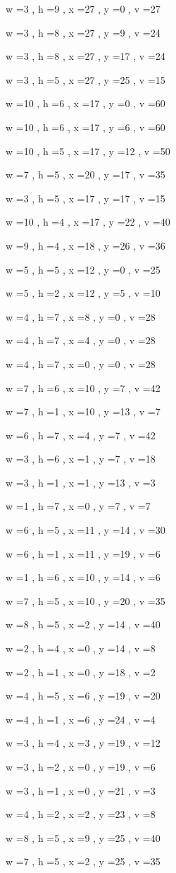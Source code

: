 \documentclass[11pt]{article}
\begin{document}
w =3 , h =9 , x =27 , y =0 , v =27
\par
w =3 , h =8 , x =27 , y =9 , v =24
\par
w =3 , h =8 , x =27 , y =17 , v =24
\par
w =3 , h =5 , x =27 , y =25 , v =15
\par
w =10 , h =6 , x =17 , y =0 , v =60
\par
w =10 , h =6 , x =17 , y =6 , v =60
\par
w =10 , h =5 , x =17 , y =12 , v =50
\par
w =7 , h =5 , x =20 , y =17 , v =35
\par
w =3 , h =5 , x =17 , y =17 , v =15
\par
w =10 , h =4 , x =17 , y =22 , v =40
\par
w =9 , h =4 , x =18 , y =26 , v =36
\par
w =5 , h =5 , x =12 , y =0 , v =25
\par
w =5 , h =2 , x =12 , y =5 , v =10
\par
w =4 , h =7 , x =8 , y =0 , v =28
\par
w =4 , h =7 , x =4 , y =0 , v =28
\par
w =4 , h =7 , x =0 , y =0 , v =28
\par
w =7 , h =6 , x =10 , y =7 , v =42
\par
w =7 , h =1 , x =10 , y =13 , v =7
\par
w =6 , h =7 , x =4 , y =7 , v =42
\par
w =3 , h =6 , x =1 , y =7 , v =18
\par
w =3 , h =1 , x =1 , y =13 , v =3
\par
w =1 , h =7 , x =0 , y =7 , v =7
\par
w =6 , h =5 , x =11 , y =14 , v =30
\par
w =6 , h =1 , x =11 , y =19 , v =6
\par
w =1 , h =6 , x =10 , y =14 , v =6
\par
w =7 , h =5 , x =10 , y =20 , v =35
\par
w =8 , h =5 , x =2 , y =14 , v =40
\par
w =2 , h =4 , x =0 , y =14 , v =8
\par
w =2 , h =1 , x =0 , y =18 , v =2
\par
w =4 , h =5 , x =6 , y =19 , v =20
\par
w =4 , h =1 , x =6 , y =24 , v =4
\par
w =3 , h =4 , x =3 , y =19 , v =12
\par
w =3 , h =2 , x =0 , y =19 , v =6
\par
w =3 , h =1 , x =0 , y =21 , v =3
\par
w =4 , h =2 , x =2 , y =23 , v =8
\par
w =8 , h =5 , x =9 , y =25 , v =40
\par
w =7 , h =5 , x =2 , y =25 , v =35
\par
\newpage
\end{document}
